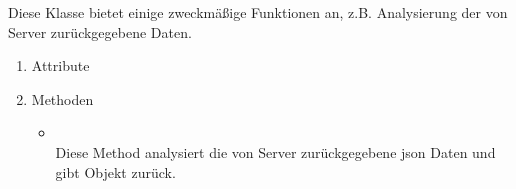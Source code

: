 \documentclass[a4paper]{scrreprt}
\begin{document}
                    Diese Klasse bietet einige zweckmäßige Funktionen an, z.B. Analysierung der  von Server zurückgegebene Daten.

                    \begin{enumerate}
                        \item Attribute
                        \item Methoden
                            \begin{itemize}
                                \item {}\\
                                Diese Method analysiert die von Server zurückgegebene json Daten und gibt  Objekt zurück.
                            \end{itemize}
                    \end{enumerate}


    \glsaddall
    \printglossary

    \listoffigures
\end{document}

